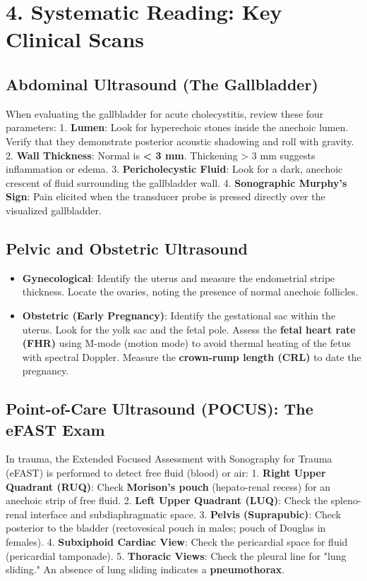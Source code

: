 \section*{4. Systematic Reading: Key Clinical Scans}

\subsection*{Abdominal Ultrasound (The Gallbladder)}
When evaluating the gallbladder for acute cholecystitis, review these four parameters:
1. \textbf{Lumen}: Look for hyperechoic stones inside the anechoic lumen. Verify that they demonstrate posterior acoustic shadowing and roll with gravity.
2. \textbf{Wall Thickness}: Normal is \textbf{< 3 mm}. Thickening > 3 mm suggests inflammation or edema.
3. \textbf{Pericholecystic Fluid}: Look for a dark, anechoic crescent of fluid surrounding the gallbladder wall.
4. \textbf{Sonographic Murphy's Sign}: Pain elicited when the transducer probe is pressed directly over the visualized gallbladder.

\subsection*{Pelvic and Obstetric Ultrasound}
\begin{itemize}
    \item \textbf{Gynecological}: Identify the uterus and measure the endometrial stripe thickness. Locate the ovaries, noting the presence of normal anechoic follicles.
    \item \textbf{Obstetric (Early Pregnancy)}: Identify the gestational sac within the uterus. Look for the yolk sac and the fetal pole. Assess the \textbf{fetal heart rate (FHR)} using M-mode (motion mode) to avoid thermal heating of the fetus with spectral Doppler. Measure the \textbf{crown-rump length (CRL)} to date the pregnancy.
\end{itemize}

\subsection*{Point-of-Care Ultrasound (POCUS): The eFAST Exam}
In trauma, the Extended Focused Assessment with Sonography for Trauma (eFAST) is performed to detect free fluid (blood) or air:
1. \textbf{Right Upper Quadrant (RUQ)}: Check \textbf{Morison's pouch} (hepato-renal recess) for an anechoic strip of free fluid.
2. \textbf{Left Upper Quadrant (LUQ)}: Check the spleno-renal interface and subdiaphragmatic space.
3. \textbf{Pelvis (Suprapubic)}: Check posterior to the bladder (rectovesical pouch in males; pouch of Douglas in females).
4. \textbf{Subxiphoid Cardiac View}: Check the pericardial space for fluid (pericardial tamponade).
5. \textbf{Thoracic Views}: Check the pleural line for "lung sliding." An absence of lung sliding indicates a \textbf{pneumothorax}.


